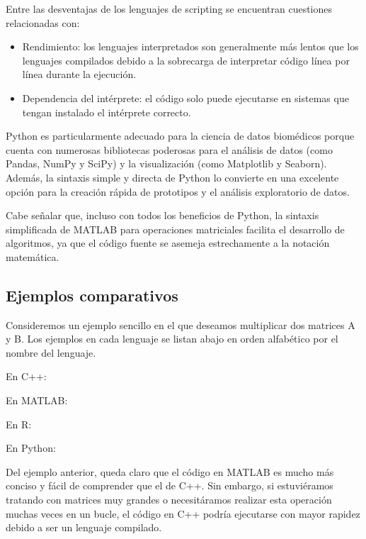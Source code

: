 Entre las desventajas de los lenguajes de scripting se encuentran cuestiones relacionadas con:

\begin{itemize}
	\item Rendimiento: los lenguajes interpretados son generalmente más lentos que los lenguajes compilados debido a la sobrecarga de interpretar código línea por línea durante la ejecución.
	\item Dependencia del intérprete: el código solo puede ejecutarse en sistemas que tengan instalado el intérprete correcto.
\end{itemize}

Python es particularmente adecuado para la ciencia de datos biomédicos porque cuenta con numerosas bibliotecas poderosas para el análisis de datos (como Pandas, NumPy y SciPy) y la visualización (como Matplotlib y Seaborn). Además, la sintaxis simple y directa de Python lo convierte en una excelente opción para la creación rápida de prototipos y el análisis exploratorio de datos.

Cabe señalar que, incluso con todos los beneficios de Python, la sintaxis simplificada de MATLAB para operaciones matriciales facilita el desarrollo de algoritmos, ya que el código fuente se asemeja estrechamente a la notación matemática.

\subsection{Ejemplos comparativos}

Consideremos un ejemplo sencillo en el que deseamos multiplicar dos matrices A y B. Los ejemplos en cada lenguaje se listan abajo en orden alfabético por el nombre del lenguaje.

En C++:


En MATLAB:



En R:


En Python:


Del ejemplo anterior, queda claro que el código en MATLAB es mucho más conciso y fácil de comprender que el de C++. Sin embargo, si estuviéramos tratando con matrices muy grandes o necesitáramos realizar esta operación muchas veces en un bucle, el código en C++ podría ejecutarse con mayor rapidez debido a ser un lenguaje compilado.

